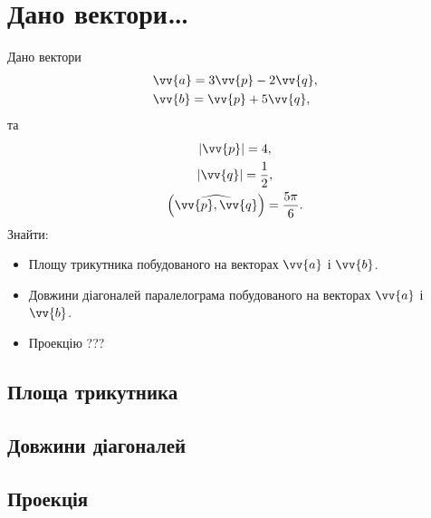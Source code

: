 \ansver


\section{Дано вектори\dots}
Дано вектори
\begin{align}
	&\vv{a}=3\vv{p}-2\vv{q},\\
	&\vv{b}=\vv{p}+5\vv{q},
\end{align}
та
\begin{gather}
	\lvert\vv{p}\rvert=4,\\
	\lvert\vv{q}\rvert=\frac{1}{2},\\
	\left(\widehat{\vv{p},\vv{q}}\right)=\frac{5\pi}{6}.
\end{gather}
Знайти:
\begin{itemize}
	\item Площу трикутника побудованого на векторах \(\vv{a}\) і \(\vv{b}\).
	\item Довжини діагоналей паралелограма побудованого на векторах \(\vv{a}\) і \(\vv{b}\).
	\item Проекцію ???
\end{itemize}
\subsection{Площа трикутника}
\solving


\ansver
\subsection{Довжини діагоналей}
\solving


\ansver
\subsection{Проекція}
\solving


\ansver
